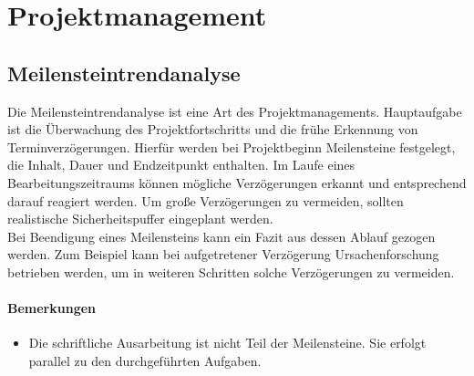 \section{Projektmanagement}
\subsection{Meilensteintrendanalyse}
Die Meilensteintrendanalyse ist eine Art des Projektmanagements. Hauptaufgabe ist die Überwachung des Projektfortschritts und die frühe Erkennung von Terminverzögerungen. Hierfür werden bei Projektbeginn Meilensteine festgelegt, die Inhalt, Dauer und Endzeitpunkt enthalten. Im Laufe eines Bearbeitungszeitraums können mögliche Verzögerungen erkannt und entsprechend darauf reagiert werden. Um große Verzögerungen zu vermeiden, sollten realistische Sicherheitspuffer eingeplant werden. \\
Bei Beendigung eines Meilensteins kann ein Fazit aus dessen Ablauf gezogen werden. Zum Beispiel kann bei aufgetretener Verzögerung Ursachenforschung betrieben werden, um in weiteren Schritten solche Verzögerungen zu vermeiden. 

\paragraph{Bemerkungen}
\begin{itemize}
\item Die schriftliche Ausarbeitung ist nicht Teil der Meilensteine. Sie erfolgt parallel zu den durchgeführten Aufgaben.
\end{itemize}

